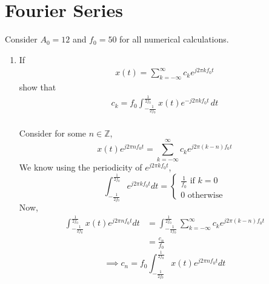 \documentclass[journal,12pt,twocolumn]{IEEEtran}
\renewcommand\thesection{\arabic{section}}
\begin{document}
\section{Fourier Series}

Consider $A_0 =12$ and $f_0 = 50$ for all numerical calculations.

\begin{enumerate}[label=\thesection.\arabic*,ref=\thesection.\theenumi]

\item If
	\begin{align}
		x(t) = \sum_{k = -\infty}^{\infty}c_ke^{j2\pi kf_0 t}
	\label{eq:one-Z-complex}
	\end{align}
	show that
	\begin{align}
		c_k = f_0\int_{-\frac{1}{2f_0}}^{\frac{1}{2f_0}}x(t)e^{-j2\pi kf_0 t}\, dt
	\label{eq:one-Z}
	\end{align}
	\solution\\
	Consider for some \( n \in \mathbb{Z} \),
	\[ x(t) e^{j2\pi nf_0t} = \sum_{k=-\infty}^\infty c_k e^{j2\pi (k-n) f_0t} \]
	We know using the periodicity of \( e^{j2\pi kf_0t} \),
	\[
		\int_{-\frac{1}{2f_0}}^{\frac{1}{2f_0}} e^{j2\pi kf_0t} dt =
		\begin{cases}
			\frac{1}{f_0} \text{ if } k=0 \\
			0 \text{ otherwise}
		\end{cases}
	\]
	Now,
	\begin{align*}
		\int_{-\frac{1}{2f_0}}^{\frac{1}{2f_0}}x(t) e^{j2\pi nf_0t} dt
		&= \int_{-\frac{1}{2f_0}}^{\frac{1}{2f_0}}
		\sum_{k=-\infty}^\infty c_k e^{j2\pi (k-n) f_0t} \\
		&= \frac{c_n}{f_0}
	\end{align*}
	\[
		\implies c_n = f_0 \int_{-\frac{1}{2f_0}}^{\frac{1}{2f_0}}x(t) e^{j2\pi nf_0t} dt
	\]
	
	\pagebreak


\end{enumerate}
\end{document}
